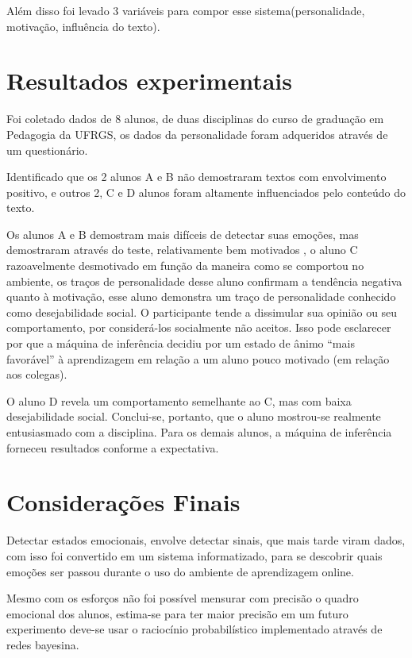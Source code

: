 \documentclass[12pt,a4paper,twocolumn]{article}
\begin{document}
Além disso foi levado 3 variáveis para compor esse sistema(personalidade, motivação, influência do texto).

\section{Resultados experimentais}

Foi coletado dados de 8 alunos, de duas disciplinas do curso de graduação em Pedagogia da UFRGS, os dados da personalidade foram adqueridos através de um questionário.

Identificado que os 2 alunos A e B não demostraram textos com envolvimento positivo, e outros 2, C e D alunos foram altamente influenciados pelo conteúdo do texto.

Os alunos A e B demostram mais difíceis de detectar suas emoções, mas demostraram através do teste, relativamente bem motivados , o aluno C razoavelmente desmotivado em função da maneira como se comportou no ambiente, os traços de personalidade desse aluno confirmam a tendência negativa quanto à motivação, esse aluno demonstra um traço de personalidade conhecido como desejabilidade social. O participante tende a dissimular sua opinião ou seu comportamento, por considerá-los socialmente não aceitos. Isso pode esclarecer por que a máquina de inferência decidiu por um estado de ânimo “mais favorável” à aprendizagem em relação a um aluno pouco motivado (em relação aos colegas).

O aluno D revela um comportamento semelhante ao C, mas com baixa desejabilidade social. Conclui-se, portanto, que o aluno mostrou-se realmente entusiasmado com a disciplina. Para os demais alunos, a máquina de inferência forneceu resultados conforme a expectativa. 
\section{Considerações Finais}

Detectar estados emocionais, envolve detectar sinais, que mais tarde viram dados, com isso foi convertido em um sistema informatizado, para se descobrir quais emoções ser passou durante o uso do ambiente de aprendizagem online.

Mesmo com os esforços não foi possível mensurar com precisão o quadro emocional dos alunos, estima-se para ter maior precisão em um futuro experimento deve-se usar o raciocínio probabilístico implementado através de redes bayesina.
\end{document}
